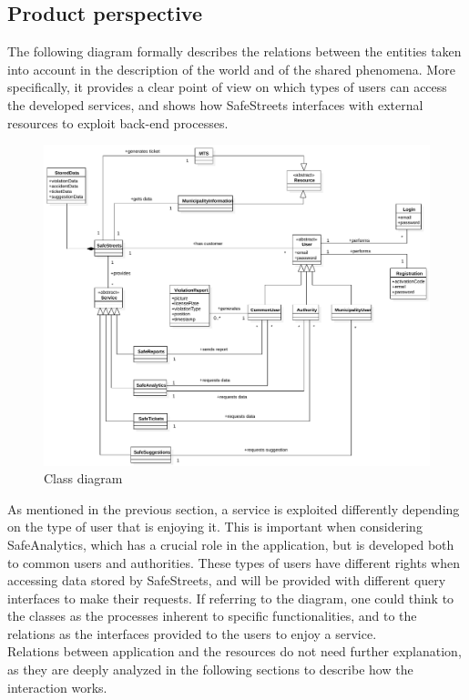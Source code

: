 \documentclass[a4paper]{article}
\begin{document}
\subsection{Product perspective}

The following diagram formally describes the relations between the
entities taken into account in the description of the world and of the
shared phenomena. More specifically, it provides a clear point of view
on which types of users can access the developed services, and shows how
SafeStreets interfaces with external resources to exploit back-end
processes.

\begin{figure}[H]
\centering
\includegraphics[width=\textwidth]{class_diagram}
\caption{Class diagram}
\end{figure}

As mentioned in the previous section, a service is exploited differently
depending on the type of user that is enjoying it. This is important
when considering SafeAnalytics, which has a crucial role in the
application, but is developed both to common users and authorities.
These types of users have different rights when accessing data stored by
SafeStreets, and will be provided with different query interfaces to
make their requests. If referring to the diagram, one could think to the
classes as the processes inherent to specific functionalities, and to
the relations as the interfaces provided to the users to enjoy a
service.\\
Relations between application and the resources do not need further
explanation, as they are deeply analyzed in the following sections to
describe how the interaction works.
\end{document}
